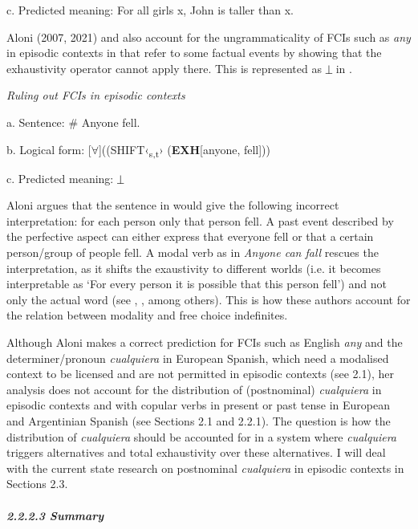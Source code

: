 \documentclass[output=paper]{langscibook}
\begin{document}
  c.  Predicted meaning: For all girls x, John is taller than x.

    \citep{AloniEtAl2011}

Aloni (2007, 2021) and \citet{AloniEtAl2013} also account for the ungrammaticality of FCIs such as \textit{any} in episodic contexts in  that refer to some factual events by showing that the exhaustivity operator cannot apply there. This is represented as ⏊ in . 

\label{bkm:Ref517204}  \textit{Ruling out FCIs in episodic contexts} 

  a.  Sentence: \# Anyone fell.

  b.  Logical form: [${\forall}$]((\textsc{SHIFT}‹\textsubscript{s,t}› (\textbf{EXH}[anyone, fell]))

  c.  Predicted meaning: ⏊

    \citep{Aloni2021}

Aloni argues that the sentence in  would give the following incorrect interpretation: for each person only that person fell. A past event described by the perfective aspect can either express that everyone fell or that a certain person/group of people fell. A modal verb as in \textit{Anyone can fall} rescues the interpretation, as it shifts the exaustivity to different worlds (i.e. it becomes interpretable as ‘For every person it is possible that this person fell’) and not only the actual word (see \citealt{Menéndez-Benito2010}, \citealt{Aloni2021}, among others). This is how these authors account for the relation between modality and free choice indefinites.

  Although Aloni makes a correct prediction for FCIs such as English \textit{any} and the determiner/pronoun \textit{cualquiera} in European Spanish, which need a modalised context to be licensed and are not permitted in episodic contexts (see 2.1), her analysis does not account for the distribution of (postnominal) \textit{cualquiera} in episodic contexts and with copular verbs in present or past tense in European and Argentinian Spanish (see Sections 2.1 and 2.2.1). The question is how the distribution of \textit{cualquiera} should be accounted for in a system where \textit{cualquiera} triggers alternatives and total exhaustivity over these alternatives. I will deal with the current state research on postnominal \textit{cualquiera} in episodic contexts in Sections 2.3.

\paragraph{\textit{2.2.2.3 Summary}}
\end{document}
